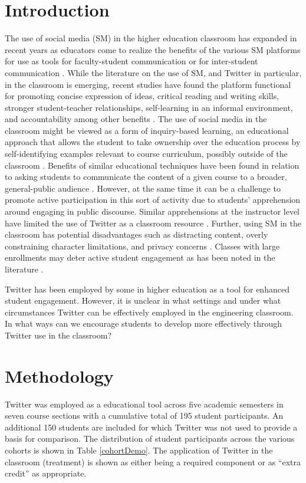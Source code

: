 \documentclass[12pt]{article}
\begin{document}
\section*{Introduction}
The use of social media (SM) in the higher education classroom has expanded in recent years as educators come to realize the benefits of the various SM platforms for use as tools for faculty-student communication or for inter-student communication \cite{blessing_using_2012}. While the literature on the use of SM, and Twitter in particular, in the classroom is emerging, recent studies have found the platform functional for promoting concise expression of ideas, critical reading and writing skills, stronger student-teacher relationships, self-learning in an informal environment, and accountability among other benefits \cite{shiffman_twitter_2012}. The use of social media in the classroom might be viewed as a form of inquiry-based learning, an educational approach that allows the student to take ownership over the education process by self-identifying examples relevant to course curriculum, possibly outside of the classroom \cite{magnussen_impact_2000, prince_does_2004}. Benefits of similar educational techniques have been found in relation to asking students to communicate the content of a given course to a broader, general-public audience \cite{junco_effect_2011, ha_influence_2013}. However, at the same time it can be a challenge to promote active participation in this sort of activity due to students’ apprehension around engaging in public discourse. Similar apprehensions at the instructor level have limited the use of Twitter as a classroom resource \cite{carpenter_how_2014}. Further, using SM in the classroom has potential disadvantages such as distracting content, overly constraining character limitations, and privacy concerns \cite{dhir_tweeters_2013}. Classes with large enrollments may deter active student engagement as has been noted in the literature \cite{ahlfeldt_measurement_2005}.  

Twitter has been employed by some in higher education as a tool for enhanced student engagement. However, it is unclear in what settings and under what circumstances Twitter can be effectively employed in the engineering classroom. In what ways can we encourage students to develop more effectively through Twitter use in the classroom?


\section*{Methodology}
Twitter was employed as a educational tool across five academic semesters in seven course sections with a cumulative total of 195 student participants. An additional 150 students are included for which Twitter was not used to provide a basis for comparison. The distribution of student participants across the various cohorts is shown in Table \ref{cohortDemo}. The application of Twitter in the classroom (treatment) is shown as either being a required component or as ``extra credit'' as appropriate.
\end{document}
